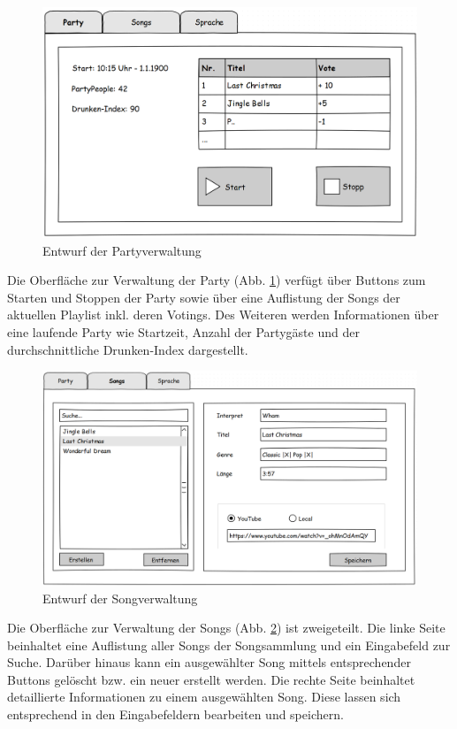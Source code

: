 \begin{figure}[H]
\centering
\includegraphics[width=0.85\linewidth]{Bilder/MockParty}
\caption{Entwurf der Partyverwaltung}
\label{fig:MockParty}
\end{figure}

Die Oberfläche zur Verwaltung der Party (Abb. \ref{fig:MockParty}) verfügt über Buttons zum Starten und Stoppen der Party sowie über eine Auflistung der Songs der aktuellen Playlist inkl. deren Votings. Des Weiteren werden Informationen über eine laufende Party wie Startzeit, Anzahl der Partygäste und der durchschnittliche Drunken-Index dargestellt.

\begin{figure}[H]
\centering
\includegraphics[width=1\linewidth]{Bilder/MockSongVerwaltung}
\caption{Entwurf der Songverwaltung}
\label{fig:MockSongVerwaltung}
\end{figure}

Die Oberfläche zur Verwaltung der Songs (Abb. \ref{fig:MockSongVerwaltung}) ist zweigeteilt. Die linke Seite beinhaltet eine Auflistung aller Songs der Songsammlung und ein Eingabefeld zur Suche. Darüber hinaus kann ein ausgewählter Song mittels entsprechender Buttons gelöscht bzw. ein neuer erstellt werden. Die rechte Seite 
beinhaltet detaillierte Informationen zu einem ausgewählten Song. Diese lassen sich entsprechend in den Eingabefeldern bearbeiten und speichern.

